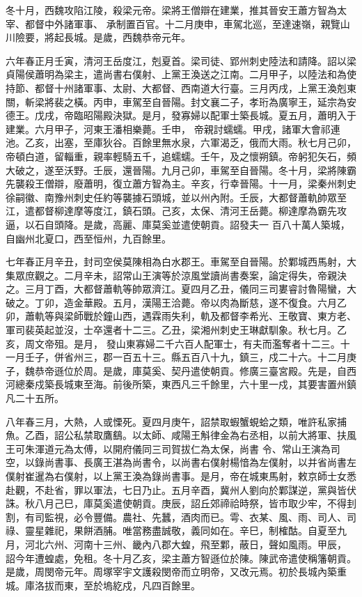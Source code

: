 \begin{pinyinscope}
 冬十月，西魏攻陷江陵，殺梁元帝。梁將王僧辯在建業，推其晉安王蕭方智為太宰、都督中外諸軍事、
 承制置百官。十二月庚申，車駕北巡，至達速嶺，親覽山川險要，將起長城。是歲，西魏恭帝元年。



 六年春正月壬寅，清河王岳度江，剋夏首。梁司徒、郢州刺史陸法和請降。詔以梁貞陽侯蕭明為梁主，遣尚書右僕射、上黨王渙送之江南。二月甲子，以陸法和為使持節、都督十州諸軍事、太尉、大都督、西南道大行臺。三月丙戌，上黨王渙剋東關，斬梁將裴之橫。丙申，車駕至自晉陽。封文襄二子，孝珩為廣寧王，延宗為安德王。戊戌，帝臨昭陽殿決獄。是月，發寡婦以配軍士築長城。夏五月，蕭明入于建業。六月甲子，河東王潘相樂薨。壬申，
 帝親討蠕蠕。甲戌，諸軍大會祁連池。乙亥，出塞，至庫狄谷。百餘里無水泉，六軍渴乏，俄而大雨。秋七月己卯，帝頓白道，留輜重，親率輕騎五千，追蠕蠕。壬午，及之懷朔鎮。帝躬犯矢石，頻大破之，遂至沃野。壬辰，還晉陽。九月己卯，車駕至自晉陽。冬十月，梁將陳霸先襲殺王僧辯，廢蕭明，復立蕭方智為主。辛亥，行幸晉陽。十一月，梁秦州刺史徐嗣徽、南豫州刺史任約等襲據石頭城，並以州內附。壬辰，大都督蕭軌帥眾至江，遣都督柳達摩等度江，鎮石頭。己亥，太保、清河王岳薨。柳達摩為霸先攻逼，以石自頭降。是歲，高麗、庫莫奚並遣使朝貢。詔發夫一
 百八十萬人築城，自幽州北夏口，西至恒州，九百餘里。



 七年春正月辛丑，封司空侯莫陳相為白水郡王。車駕至自晉陽。於鄴城西馬射，大集眾庶觀之。二月辛未，詔常山王演等於涼風堂讀尚書奏案，論定得失，帝親決之。三月丁酉，大都督蕭軌等帥眾濟江。夏四月乙丑，儀同三司婁睿討魯陽蠻，大破之。丁卯，造金華殿。五月，漢陽王洽薨。帝以肉為斷慈，遂不復食。六月乙卯，蕭軌等與梁師戰於鐘山西，遇霖雨失利，軌及都督李希光、王敬寶、東方老、軍司裴英起並沒，士卒還者十二三。乙丑，梁湘州刺史王琳獻馴象。秋七月。乙亥，周文帝殂。是月，
 發山東寡婦二千六百人配軍士，有夫而濫奪者十二三。十一月壬子，併省州三，郡一百五十三。縣五百八十九，鎮三，戍二十六。十二月庚子，魏恭帝遜位於周。是歲，庫莫奚、契丹遣使朝貢。修廣三臺宮殿。先是，自西河總秦戍築長城東至海。前後所築，東西凡三千餘里，六十里一戍，其要害置州鎮凡二十五所。



 八年春三月，大熱，人或慄死。夏四月庚午，詔禁取蝦蟹蜆蛤之類，唯許私家捕魚。乙酉，詔公私禁取鷹鷂。以太師、咸陽王斛律金為右丞相，以前大將軍、扶風王可朱渾道元為太傅，以開府儀同三司賀拔仁為太保，尚書
 令、常山王演為司空，以錄尚書事、長廣王湛為尚書令，以尚書右僕射楊愔為左僕射，以并省尚書左僕射崔暹為右僕射，以上黨王渙為錄尚書事。是月，帝在城東馬射，敕京師士女悉赴觀，不赴省，罪以軍法，七日乃止。五月辛酉，冀州人劉向於鄴謀逆，黨與皆伏誅。秋八月己巳，庫莫奚遣使朝貢。庚辰，詔丘郊禘祫時祭，皆市取少牢，不得刲割，有司監視，必令豐備。農社、先蠶，酒肉而已。雩、衣某、風、雨、司人、司祿、靈星雜祀，果餅酒脯。唯當務盡誠敬，義同如在。辛巳，制榷酤。自夏至九月，河北六州、河南十三州、畿內八郡大蝗，飛至鄴，蔽日，聲如風雨。甲辰，
 詔今年遭蝗處，免租。冬十月乙亥，梁主蕭方智遜位於陳。陳武帝遣使稱籓朝貢。是歲，周閔帝元年。周塚宰宇文護殺閔帝而立明帝，又改元焉。初於長城內築重城。庫洛拔而東，至於塢紇戍，凡四百餘里。




\end{pinyinscope}
